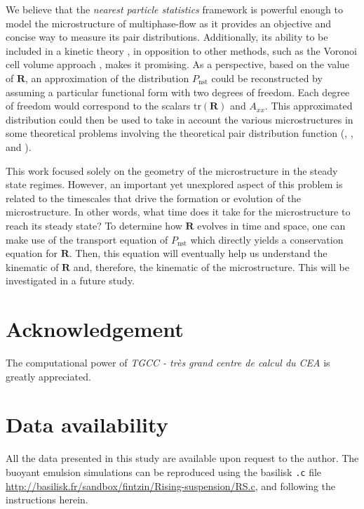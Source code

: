 We believe that the \textit{nearest particle statistics} framework is powerful enough to model the microstructure of multiphase-flow as it provides an objective and concise way to measure its pair distributions. 
Additionally, its ability to be included in a kinetic theory \citep{zhang2023evolution}, in opposition to other methods,  such as the Voronoi cell volume approach \citep{senthil2005voronoi}, makes it promising. As a perspective, based on the value of $\textbf{R}$, an approximation of the distribution $P_\text{nst}$ could be reconstructed by assuming a particular functional form with two degrees of freedom.
Each degree of freedom would correspond to the scalars $\text{tr}(\textbf{R})$ and $A_{xx}$.
This approximated distribution could then be used to take in account the various microstructures in some theoretical problems involving the theoretical pair distribution function (\citet{batchelor1972sedimentation}, \citet{hinch1977averaged,wang1999longitudinal}, and \citet{zhang2021ensemble}).

This work focused solely on the geometry of the microstructure in the steady state regimes. 
However, an important yet unexplored aspect of this problem is related to the timescales that drive the formation or evolution of the microstructure. 
In other words, what time does it take for the microstructure to reach its steady state? 
To determine how $\textbf{R}$ evolves in time and space, one can make use of the transport equation of $P_\text{nst}$ which directly yields a conservation equation for $\textbf{R}$. 
Then, this equation will eventually help us understand the kinematic of $\textbf{R}$ and, therefore, the kinematic of the microstructure. 
This will be investigated in a future study. 

 

\section*{Acknowledgement}

The computational power of  \textit{TGCC - tr\`es grand centre de calcul du CEA} is greatly appreciated. 
\section*{Data availability}

All the data presented in this study are available upon request to the author. 
The buoyant emulsion simulations can be reproduced using the basilisk \texttt{.c} file \url{http://basilisk.fr/sandbox/fintzin/Rising-suspension/RS.c}, and following the instructions herein. 
